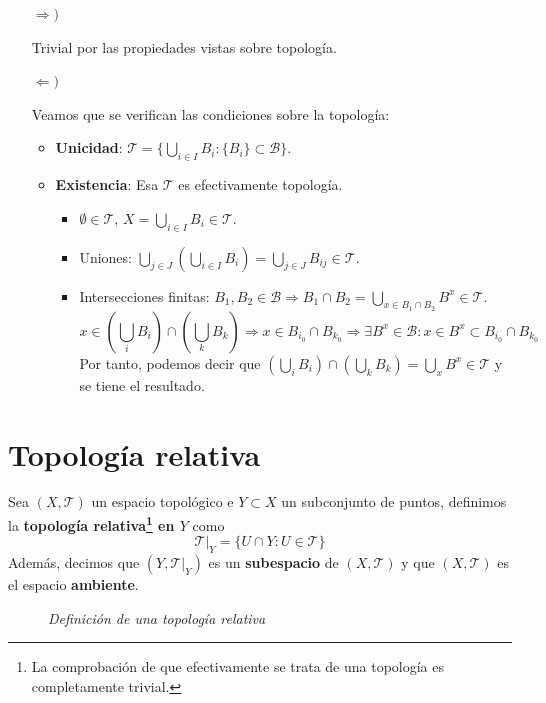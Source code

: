 \begin{demo}
\begin{itemize}
\item[$\Rightarrow)$]

Trivial por las propiedades vistas sobre topología.

\item[$\Leftarrow)$]

Veamos que se verifican las condiciones sobre la topología:
\begin{itemize}
    \item \textbf{Unicidad}: $\mathcal{T} = \{\bigcup_{i \in  I} B_i: \{B_i\} \subset \mathcal{B}\}$.
    \item \textbf{Existencia}: Esa $\mathcal{T}$ es efectivamente topología. 
        \begin{itemize}
            \item $\emptyset \in \mathcal{T}$, $X = \bigcup_{i\in I} B_i \in \mathcal{T}$.
            \item Uniones: $\bigcup_{j\in J} \left(\bigcup_{i\in I} B_{i}\right) = \bigcup_{j\in J} B_{ij} \in \mathcal{T}$. 
            \item Intersecciones finitas: $B_1, B_2 \in \mathcal{B} \Rightarrow B_1 \cap B_2 = \bigcup_{x \in B_1 \cap B_2} B^x \in \mathcal{T}$.
            $$
            x \in \left( \bigcup_{i} B_i \right) \cap \left( \bigcup_{k} B_k \right) \Rightarrow x \in B_{i_0} \cap B_{k_0} \Rightarrow \exists B^x \in \mathcal{B} : x\in B^x \subset B_{i_0} \cap B_{k_0}
            $$
            Por tanto, podemos decir que $\left( \bigcup_{i} B_i \right) \cap \left( \bigcup_{k} B_k \right) = \bigcup_{x} B^x \in \mathcal{T}
            $ y se tiene el resultado.
        \end{itemize}
\end{itemize}
\end{itemize}
\end{demo}

\section{Topología relativa}%
\label{sec:topologia_relativa}
\begin{defi}
Sea $\left( X, \mathcal{T} \right)$ un espacio topológico e $Y \subset X$ un subconjunto de puntos, definimos la \textbf{topología relativa\footnote{La comprobación de que efectivamente se trata de una topología es completamente trivial.} en $Y$} como
$$
\mathcal{T}|_Y = \{U \cap Y: U \in \mathcal{T}\}
$$
Además, decimos que $\left( Y, \mathcal{T}|_Y \right)$ es un \textbf{subespacio} de $\left( X, \mathcal{T} \right)$ y que $\left( X, \mathcal{T} \right)$ es el espacio \textbf{ambiente}. 
\end{defi}
\begin{figure}[H]
    \centering
    \caption{\textit{Definición de una topología relativa}}
    \label{fig:definición-topología-relativa}
\end{figure}

